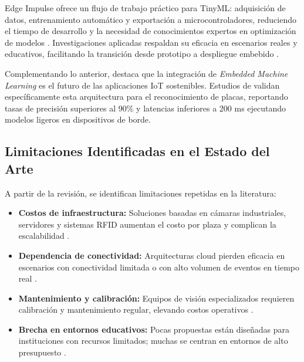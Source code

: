 \documentclass[12pt, letterpaper]{article}
\begin{document}
Edge Impulse ofrece un flujo de trabajo práctico para TinyML: adquisición de datos, entrenamiento automático y exportación a microcontroladores, reduciendo el tiempo de desarrollo y la necesidad de conocimientos expertos en optimización de modelos \parencite{edgeimpulseDocs}. Investigaciones aplicadas respaldan su eficacia en escenarios reales y educativos, facilitando la transición desde prototipo a despliegue embebido \parencite{tinyml2022EdgeImpulse}.

Complementando lo anterior, \textcite{hossain2020embeddedml} destaca que la integración de \textit{Embedded Machine Learning} es el futuro de las aplicaciones IoT sostenibles. Estudios de \textcite{nguyen2023edge} validan específicamente esta arquitectura para el reconocimiento de placas, reportando tasas de precisión superiores al 90\% y latencias inferiores a 200 ms ejecutando modelos ligeros en dispositivos de borde.

\subsection{Limitaciones Identificadas en el Estado del Arte}
A partir de la revisión, se identifican limitaciones repetidas en la literatura:
\begin{itemize}
    \item \textbf{Costos de infraestructura:} Soluciones basadas en cámaras industriales, servidores y sistemas RFID aumentan el costo por plaza y complican la escalabilidad \parencite{alam2023survey, olivares2011rfid, valeo2020patentes}.
    \item \textbf{Dependencia de conectividad:} Arquitecturas cloud pierden eficacia en escenarios con conectividad limitada o con alto volumen de eventos en tiempo real \parencite{bonomi2012fog}.
    \item \textbf{Mantenimiento y calibración:} Equipos de visión especializados requieren calibración y mantenimiento regular, elevando costos operativos \parencite{valeo2020patentes}.
    \item \textbf{Brecha en entornos educativos:} Pocas propuestas están diseñadas para instituciones con recursos limitados; muchas se centran en entornos de alto presupuesto \parencite{alam2023survey}.
\end{itemize}
\end{document}
